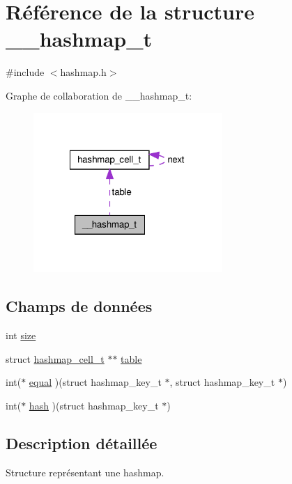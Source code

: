 \hypertarget{struct____hashmap__t}{\section{Référence de la structure \-\_\-\-\_\-hashmap\-\_\-t}
\label{struct____hashmap__t}
}


{\ttfamily \#include $<$hashmap.\-h$>$}



Graphe de collaboration de \-\_\-\-\_\-hashmap\-\_\-t\-:\nopagebreak
\begin{figure}[H]
\begin{center}
\leavevmode
\includegraphics[width=203pt]{struct____hashmap__t__coll__graph}
\end{center}
\end{figure}
\subsection*{Champs de données}
\begin{DoxyCompactItemize}
\item 
int \hyperlink{struct____hashmap__t_ab5f1e74c3fcf71ee4ac91a860cbcde19}{size}
\item 
struct \hyperlink{structhashmap__cell__t}{hashmap\-\_\-cell\-\_\-t} $\ast$$\ast$ \hyperlink{struct____hashmap__t_ac7d3b722978b8bafab2ce2a923b747aa}{table}
\item 
int($\ast$ \hyperlink{struct____hashmap__t_a2b730301a68342f67a406ce1b6c2a826}{equal} )(struct hashmap\-\_\-key\-\_\-t $\ast$, struct hashmap\-\_\-key\-\_\-t $\ast$)
\item 
int($\ast$ \hyperlink{struct____hashmap__t_aa56e33c3baa182a530a4a8bfc27c11f1}{hash} )(struct hashmap\-\_\-key\-\_\-t $\ast$)
\end{DoxyCompactItemize}


\subsection{Description détaillée}
Structure représentant une hashmap. 

